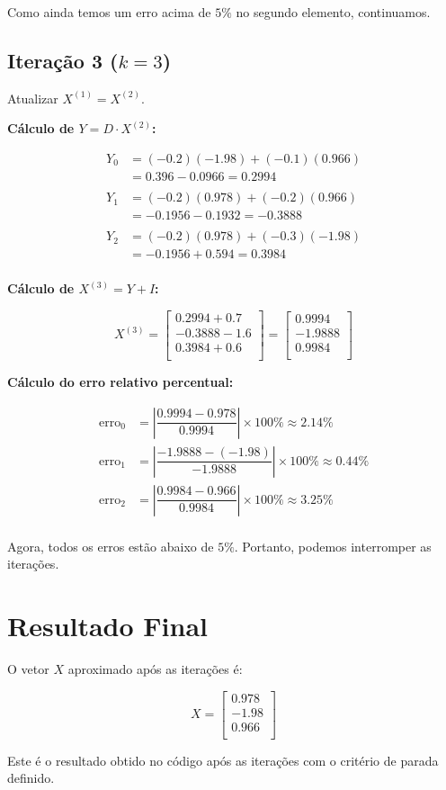 \documentclass{article}
\begin{document}
Como ainda temos um erro acima de $5\%$ no segundo elemento, continuamos.

\subsection*{Iteração 3 ($k = 3$)}

Atualizar $X^{(1)} = X^{(2)}$.

\textbf{Cálculo de $Y = D \cdot X^{(2)}$:}

\begin{align*}
Y_0 &= (-0.2)(-1.98) + (-0.1)(0.966) \\
&= 0.396 - 0.0966 = 0.2994 \\
\\
Y_1 &= (-0.2)(0.978) + (-0.2)(0.966) \\
&= -0.1956 - 0.1932 = -0.3888 \\
\\
Y_2 &= (-0.2)(0.978) + (-0.3)(-1.98) \\
&= -0.1956 + 0.594 = 0.3984 \\
\end{align*}

\textbf{Cálculo de $X^{(3)} = Y + I$:}

\[
X^{(3)} = \begin{bmatrix}
0.2994 + 0.7 \\
-0.3888 - 1.6 \\
0.3984 + 0.6 \\
\end{bmatrix} = \begin{bmatrix}
0.9994 \\
-1.9888 \\
0.9984 \\
\end{bmatrix}
\]

\textbf{Cálculo do erro relativo percentual:}

\begin{align*}
\text{erro}_0 &= \left| \dfrac{0.9994 - 0.978}{0.9994} \right| \times 100\% \approx 2.14\% \\
\text{erro}_1 &= \left| \dfrac{-1.9888 - (-1.98)}{-1.9888} \right| \times 100\% \approx 0.44\% \\
\text{erro}_2 &= \left| \dfrac{0.9984 - 0.966}{0.9984} \right| \times 100\% \approx 3.25\% \\
\end{align*}

Agora, todos os erros estão abaixo de $5\%$. Portanto, podemos interromper as iterações.

\section*{Resultado Final}

O vetor $X$ aproximado após as iterações é:

\[
X = \begin{bmatrix}
0.978 \\
-1.98 \\
0.966 \\
\end{bmatrix}
\]

Este é o resultado obtido no código após as iterações com o critério de parada definido.
\end{document}
